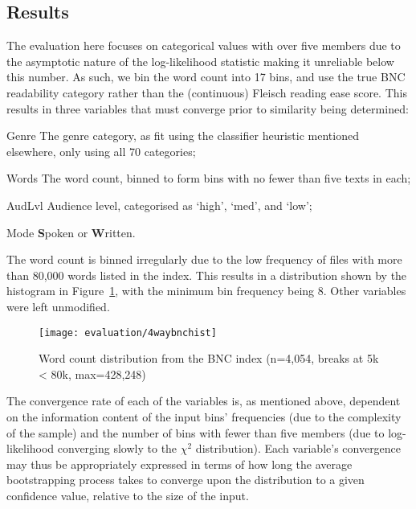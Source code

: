 \subsection{Results}

The evaluation here focuses on categorical values with over five members due to the asymptotic nature of the log-likelihood statistic making it unreliable below this number.  As such, we bin the word count into 17 bins, and use the true BNC readability category rather than the (continuous) Fleisch reading ease score.  This results in three variables that must converge prior to similarity being determined:

\begin{itemizeTitle}
    \item[Genre]  The genre category, as fit using the classifier heuristic mentioned elsewhere, only using all 70 categories;
    \item[Words]  The word count, binned to form bins with no fewer than five texts in each;
    \item[AudLvl] Audience level, categorised as `high', `med', and `low';
    \item[Mode]   \textbf{S}poken or \textbf{W}ritten.
\end{itemizeTitle}

The word count is binned irregularly due to the low frequency of files with more than 80,000 words listed in the index.  This results in a distribution shown by the histogram in Figure~\ref{fig:evaluation:resampling:bncwordhist}, with the minimum bin frequency being 8.  Other variables were left unmodified.


\begin{figure}[ht]
    \centering
    \texttt{[image: evaluation/4waybnchist]}
    \caption{Word count distribution from the BNC index (n=4,054, breaks at 5k < 80k, max=428,248)}
    \label{fig:evaluation:resampling:bncwordhist}
\end{figure}


The convergence rate of each of the variables is, as mentioned above, dependent on the information content of the input bins' frequencies (due to the complexity of the sample) and the number of bins with fewer than five members (due to log-likelihood converging slowly to the $\chi^2$ distribution).  Each variable's convergence may thus be appropriately expressed in terms of how long the average bootstrapping process takes to converge upon the distribution to a given confidence value, relative to the size of the input.

